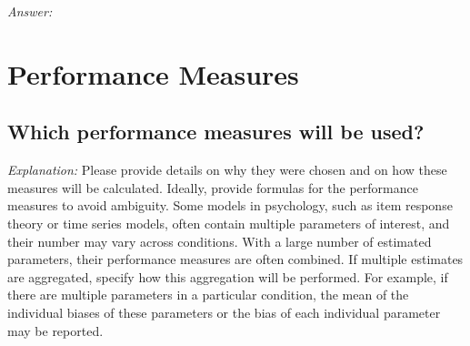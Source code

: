 \documentclass[12pt]{article}
\begin{document}
\textit{Answer:}

\section{Performance Measures}
\subsection{Which performance measures will be used?}

\textit{Explanation:} Please provide details on why they were chosen and on how these measures will be calculated. Ideally, provide formulas for the performance measures to avoid ambiguity. Some models in psychology, such as item response theory or time series models, often contain multiple parameters of interest, and their number may vary across conditions. With a large number of estimated parameters, their performance measures are often combined. If multiple estimates are aggregated, specify how this aggregation will be performed. For example, if there are multiple parameters in a particular condition, the mean of the individual biases of these parameters or the bias of each individual parameter may be reported.
\end{document}
